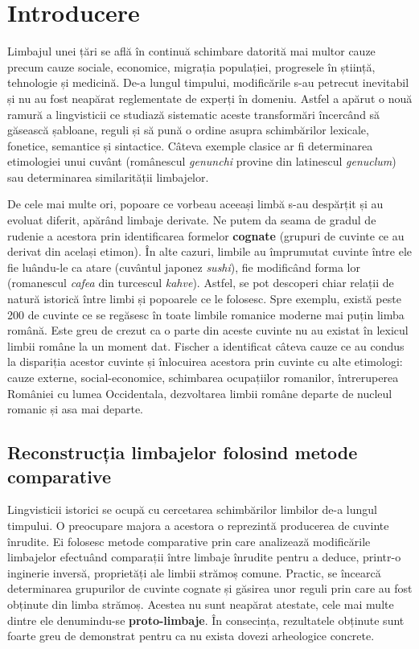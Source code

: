 \chapter{Introducere}
Limbajul unei țări se află în continuă schimbare datorită mai multor cauze precum cauze sociale, 
economice, migrația populației, progresele în știință, tehnologie și medicină. De-a lungul timpului,
modificările s-au petrecut inevitabil și nu au fost neapărat reglementate de experți în domeniu.
Astfel a apărut o nouă ramură a lingvisticii ce studiază sistematic aceste transformări încercând
să găsească șabloane, reguli și să pună o ordine asupra schimbărilor lexicale, fonetice, semantice
și sintactice. Câteva exemple clasice ar fi determinarea etimologiei unui cuvânt (românescul
\textit{genunchi} provine din latinescul \textit{genuclum}) sau determinarea similarității
limbajelor.

De cele mai multe ori, popoare ce vorbeau aceeași limbă s-au despărțit și au evoluat diferit, apărând
limbaje derivate. Ne putem da seama de gradul de rudenie a acestora prin identificarea
formelor \textbf{cognate} (grupuri de cuvinte ce au derivat din același etimon). În alte cazuri,
limbile au împrumutat cuvinte între ele fie luându-le ca atare (cuvântul japonez \textit{sushi}),
fie modificând forma lor (romanescul \textit{cafea} din turcescul \textit{kahve}). Astfel, se pot 
descoperi chiar relații de natură istorică între limbi și popoarele ce le folosesc. Spre exemplu,
există peste 200 de cuvinte ce se regăsesc în toate limbile romanice moderne mai puțin limba
română. Este greu de crezut ca o parte din aceste cuvinte nu au existat în lexicul limbii române
la un moment dat. Fischer\cite{fischer} a identificat câteva cauze ce au condus la dispariția acestor cuvinte
și înlocuirea acestora prin cuvinte cu alte etimologi: cauze externe, social-economice, schimbarea
ocupațiilor romanilor, întreruperea României cu lumea Occidentala, dezvoltarea limbii române departe
de nucleul romanic și asa mai departe.

\section{Reconstrucția limbajelor folosind metode comparative}
Lingvisticii istorici se ocupă cu cercetarea schimbărilor limbilor de-a lungul timpului. 
O preocupare majora a acestora o reprezintă producerea de cuvinte înrudite. Ei folosesc
metode comparative prin care analizează modificările limbajelor efectuând comparații între limbaje
înrudite pentru a deduce, printr-o inginerie inversă, proprietăți ale limbii strămoș comune.\cite{weissbook}
Practic, se încearcă determinarea grupurilor de cuvinte cognate și găsirea unor reguli prin care
au fost obținute din limba strămoș. Acestea nu sunt neapărat atestate, cele mai multe dintre ele 
denumindu-se \textbf{proto-limbaje}. În consecința, rezultatele obținute sunt foarte greu de demonstrat
pentru ca nu exista dovezi arheologice concrete.

